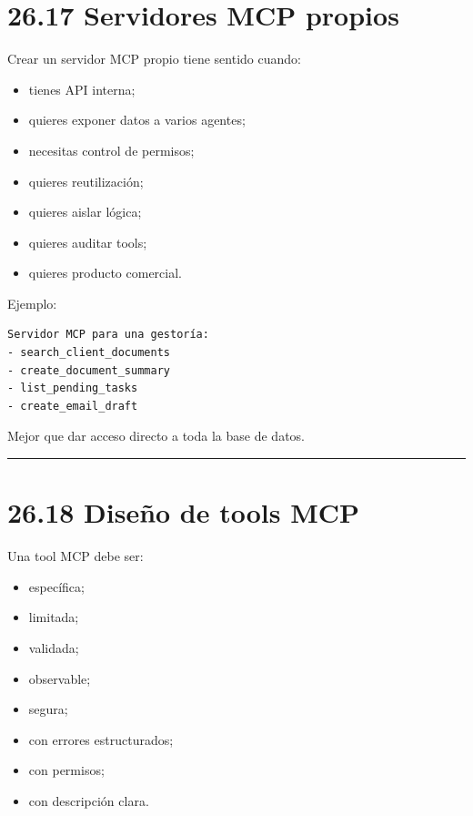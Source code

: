 \section{26.17 Servidores MCP propios}\label{servidores-mcp-propios}

Crear un servidor MCP propio tiene sentido cuando:

\begin{itemize}
\tightlist
\item
  tienes API interna;
\item
  quieres exponer datos a varios agentes;
\item
  necesitas control de permisos;
\item
  quieres reutilización;
\item
  quieres aislar lógica;
\item
  quieres auditar tools;
\item
  quieres producto comercial.
\end{itemize}

Ejemplo:

\begin{lstlisting}
Servidor MCP para una gestoría:
- search_client_documents
- create_document_summary
- list_pending_tasks
- create_email_draft
\end{lstlisting}

Mejor que dar acceso directo a toda la base de datos.

\begin{center}\rule{0.5\linewidth}{0.5pt}\end{center}

\section{26.18 Diseño de tools MCP}\label{diseuxf1o-de-tools-mcp}

Una tool MCP debe ser:

\begin{itemize}
\tightlist
\item
  específica;
\item
  limitada;
\item
  validada;
\item
  observable;
\item
  segura;
\item
  con errores estructurados;
\item
  con permisos;
\item
  con descripción clara.
\end{itemize}

